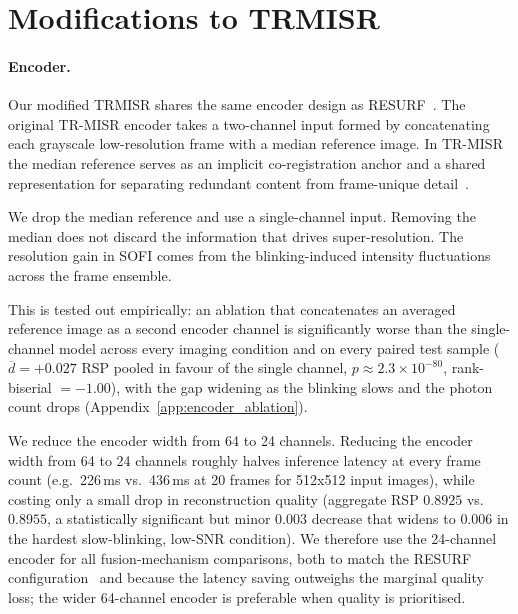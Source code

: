 \section{Modifications to TRMISR}
\label{sec:adaptation}

\paragraph{Encoder.}
Our modified TRMISR shares the same encoder design as RESURF~\cite{resurf2024}. 
The original TR-MISR encoder takes a two-channel input formed by concatenating
  each
  grayscale low-resolution frame with a median reference
  image. In TR-MISR the median reference serves as an
  implicit co-registration anchor and a shared representation for separating redundant
  content from
  frame-unique detail~\cite{TR-MISR-original}.

We drop the median reference and use a single-channel input.
  Removing the median does not discard the information that drives
  super-resolution. The
  resolution gain in SOFI comes from the blinking-induced intensity
fluctuations across the frame ensemble. 

This is tested out empirically: an ablation that concatenates an averaged
  reference image as a second encoder channel is significantly worse than the
  single-channel model across every imaging condition and on every paired test
  sample ($\overline{d} = +0.027$ RSP pooled in favour of the single channel,
  $p \approx 2.3\times10^{-80}$, rank-biserial $=-1.00$), with the gap widening
  as the blinking slows and the photon count drops
  (Appendix~\ref{app:encoder_ablation}).

We reduce the encoder width from 64 to 24 channels.
Reducing the encoder width from 64 to 24 channels roughly halves inference latency at every
frame count (e.g.\ 226\,ms vs.\ 436\,ms at 20 frames for 512x512 input images), 
while costing only a small drop in reconstruction quality (aggregate RSP
$0.8925$ vs.\ $0.8955$, a statistically significant but minor $0.003$ decrease that widens to
$0.006$ in the hardest slow-blinking, low-SNR condition).
We therefore use the 24-channel encoder for all fusion-mechanism comparisons, both to match
the RESURF configuration~\cite{resurf2024} and because the latency saving outweighs the
marginal quality loss; the wider 64-channel encoder is preferable when quality is prioritised.

